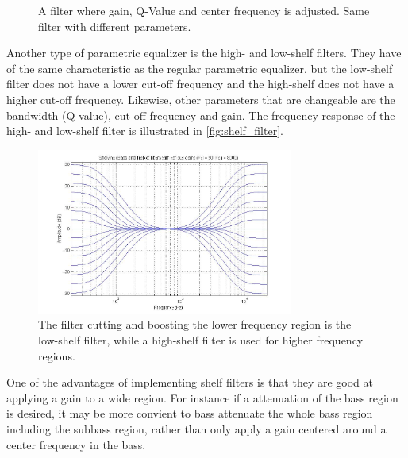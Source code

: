 \begin{figure}[H]
\centering
{}

\caption{A filter where gain, Q-Value and center frequency is adjusted. Same filter with different parameters.}
\label{fig:parametric_eq_preanalysis_comb}
\end{figure}




Another type of parametric equalizer is the high- and low-shelf filters. They have of the same characteristic as the regular parametric equalizer, but the low-shelf filter does not have a lower cut-off frequency and the high-shelf does not have a higher cut-off frequency. Likewise, other parameters that are changeable are the bandwidth (Q-value), cut-off frequency and gain. The frequency response of the high- and low-shelf filter is illustrated in \autoref{fig:shelf_filter}.

\begin{figure}[H]
\centering
\includegraphics[width=0.75\textwidth]{figures/shelf_filter.jpg}
\caption{The filter cutting and boosting the lower frequency region is the low-shelf filter, while a high-shelf filter is used for higher frequency regions.}
\label{fig:shelf_filter}
\end{figure}

One of the advantages of implementing shelf filters is that they are good at applying a gain to a wide region. For instance if a attenuation of the bass region is desired, it may be more convient to bass attenuate the whole bass region including the subbass region, rather than only apply a gain centered around a center frequency in the bass.

